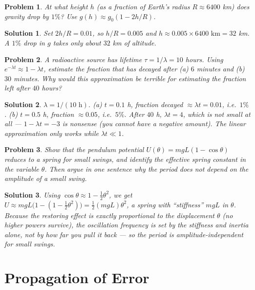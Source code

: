 \documentclass[11pt]{article}
\newcommand{\clearpts}{\addtocounter{tpts}{\value{cpts}} \setcounter{cpts}{0}}
\newcommand{\pts}[1]{\clearpts \setcounter{cpts}{#1}}
\newtheorem*{solution}{Solution}
\theoremstyle{mystyle}
\newtheorem{pproblem}{Problem}
\begin{document}
\pts{3}
\begin{pproblem}
At what height $h$ (as a fraction of Earth's radius $R \approx 6400$ km) does gravity drop
by $1\%$? Use $g(h) \approx g_0(1 - 2h/R)$.
\end{pproblem}
\begin{solution}
Set $2h/R = 0.01$, so $h/R = 0.005$ and $h \approx 0.005 \times 6400\text{ km} = 32$ km.
A $1\%$ drop in $g$ takes only about $32$ km of altitude.
\end{solution}

\pts{3}
\begin{pproblem}
A radioactive source has lifetime $\tau = 1/\lambda = 10$ hours. Using
$e^{-\lambda t}\approx 1 - \lambda t$, estimate the fraction that has decayed after
(a) $6$ minutes and (b) $30$ minutes. Why would this approximation be terrible for
estimating the fraction left after $40$ hours?
\end{pproblem}
\begin{solution}
$\lambda = 1/(10\text{ h})$. (a) $t = 0.1$ h, fraction decayed $\approx \lambda t = 0.01$,
i.e.\ $1\%$. (b) $t = 0.5$ h, fraction $\approx 0.05$, i.e.\ $5\%$. After $40$ h,
$\lambda t = 4$, which is not small at all --- $1 - \lambda t = -3$ is nonsense (you
cannot have a negative amount). The linear approximation only works while $\lambda t \ll 1$.
\end{solution}

\pts{4}
\begin{pproblem}
Show that the pendulum potential $U(\theta) = mgL(1 - \cos\theta)$ reduces to a spring
for small swings, and identify the effective spring constant in the variable $\theta$.
Then argue in one sentence why the period does not depend on the amplitude of a small
swing.
\end{pproblem}
\begin{solution}
Using $\cos\theta \approx 1 - \tfrac12\theta^2$, we get
$U \approx mgL\bigl(1 - (1 - \tfrac12\theta^2)\bigr) = \tfrac12(mgL)\theta^2$, a spring
with ``stiffness'' $mgL$ in $\theta$. Because the restoring effect is exactly
proportional to the displacement $\theta$ (no higher powers survive), the oscillation
frequency is set by the stiffness and inertia alone, not by how far you pull it back ---
so the period is amplitude-independent for small swings.
\end{solution}

\section{Propagation of Error}
\end{document}

